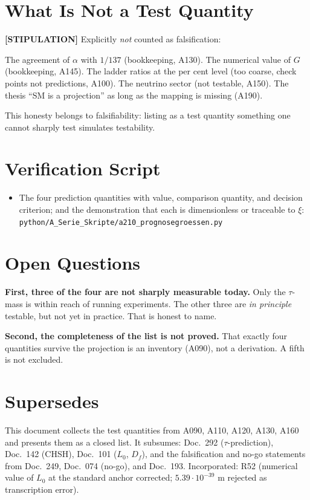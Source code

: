 \section{What Is Not a Test Quantity}

\textbf{[STIPULATION]} Explicitly \emph{not} counted as falsification:

The agreement of $\alpha$ with $1/137$ (bookkeeping, A130). The numerical value
of $G$ (bookkeeping, A145). The ladder ratios at the per cent level (too coarse,
check points not predictions, A100). The neutrino sector (not testable, A150).
The thesis ``SM is a projection'' as long as the mapping is missing (A190).

This honesty belongs to falsifiability: listing as a test quantity something one
cannot sharply test simulates testability.

\section{Verification Script}

\begin{itemize}
  \item The four prediction quantities with value, comparison quantity, and
    decision criterion; and the demonstration that each is dimensionless or
    traceable to $\xi$:
    \texttt{python/A\_Serie\_Skripte/a210\_prognosegroessen.py}
\end{itemize}

\section{Open Questions}

\textbf{First, three of the four are not sharply measurable today.} Only the
$\tau$-mass is within reach of running experiments. The other three are
\emph{in principle} testable, but not yet in practice. That is honest to name.

\textbf{Second, the completeness of the list is not proved.} That exactly four
quantities survive the projection is an inventory (A090), not a derivation. A
fifth is not excluded.

\section{Supersedes}

This document collects the test quantities from A090, A110, A120, A130, A160 and
presents them as a closed list. It subsumes: Doc.~292 ($\tau$-prediction),
Doc.~142 (CHSH), Doc.~101 ($L_0$, $D_f$), and the falsification and no-go
statements from Doc.~249, Doc.~074 (no-go), and Doc.~193. Incorporated: R52
(numerical value of $L_0$ at the standard anchor corrected; $5{.}39\cdot10^{-39}$ m
rejected as transcription error).

